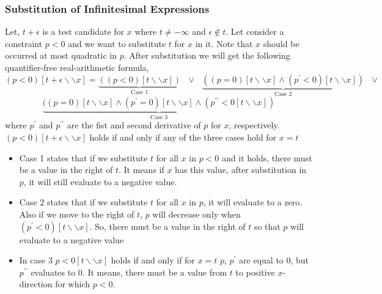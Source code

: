 \subsubsection{Substitution of Infinitesimal Expressions}
Let, $t+\epsilon$ is a test candidate for $x$ where $t\neq - \infty$ and $\epsilon \notin t$. Let consider a constraint $p<0$ and we want to substitute $t$ for $x$ in it. Note that $x$ should be occurred at most quadratic in $p$. After substitution we will get the following quantifier-free real-arithmetic formula,
$$(p<0)[t+\epsilon\backslash\backslash x]=\underbrace{((p<0)[t\backslash\backslash x])}\limits_{\text{Case 1}} \text{ }\vee\text{ }\underbrace{((p=0)[t\backslash\backslash x]\wedge(p^{\prime}<0)[t\backslash\backslash x])}\limits_{\text{Case 2}}\text{ }\vee$$
$$\underbrace{((p=0)[t\backslash\backslash x]\wedge(p^{\prime}=0)[t\backslash\backslash x]\wedge (p^{\prime\prime}<0[t\backslash\backslash x])}\limits_{\text{Case 3}} $$
where $p^{\prime}$ and $p^{\prime\prime}$ are the fist and second derivative of $p$ for $x$, respectively. $(p<0)[t+\epsilon\backslash\backslash x]$ holds if and only if any of the three cases hold for $x=t$
\begin{itemize}
	\item Case 1 states that if we substitute $t$ for all $x$ in $p<0$ and it holds, there must be a value in the right of $t$. It means if $x$ has this value, after substitution in $p$, it will still evaluate to a negative value.
	\item Case 2 states that if we substitute $t$ for all $x$ in $p$, it will evaluate to a zero. Also if we move to the right of $t$, $p$ will decrease only when $(p^{\prime}<0)[t\backslash\backslash x]$. So, there must be a value in the right of $t$ so that $p$ will evaluate to a negative value
	\item In case 3 $p<0[t\backslash\backslash x]$ holds if and only if for $x = t$ $p$, $p^{\prime}$ are equal to $0$, but $p^{\prime\prime}$ evaluates to $0$. It means, there must be a value from $t$ to positive $x$-direction for which $p<0$.
\end{itemize}

